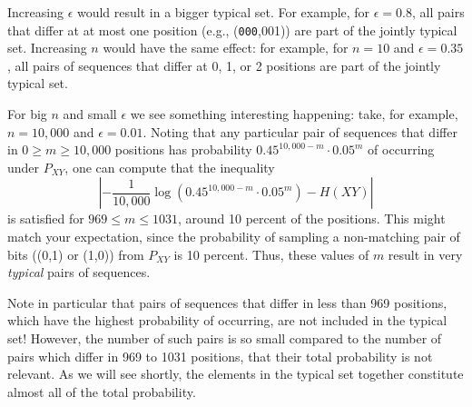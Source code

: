 \begin{example}
Increasing $\epsilon$ would result in a bigger typical set. For example, for $\epsilon = 0.8$, all pairs that differ at at most one position (e.g., (\texttt{000},{001})) are part of the jointly typical set. Increasing $n$ would have the same effect: for example, for $n = 10$ and $\epsilon = 0.35$, all pairs of sequences that differ at 0, 1, or 2 positions are part of the jointly typical set.

For big $n$ and small $\epsilon$ we see something interesting happening: take, for example, $n = 10,000$ and $\epsilon = 0.01$. Noting that any particular pair of sequences that differ in $0 \geq m \geq 10,000$ positions has probability $0.45^{10,000 - m} \cdot 0.05^m$ of occurring under $P_{XY}$, one can compute that the inequality
\[
\left| -\frac{1}{10,000} \log (0.45^{10,000 - m} \cdot 0.05^m) - H(XY)\right|
\]
is satisfied for $969 \leq m \leq 1031$, around 10 percent of the positions. This might match your expectation, since the probability of sampling a non-matching pair of bits ((0,1) or (1,0)) from $P_{XY}$ is 10 percent. Thus, these values of $m$ result in very \emph{typical} pairs of sequences.

Note in particular that pairs of sequences that differ in less than 969 positions, which have the highest probability of occurring, are not included in the typical set! However, the number of such pairs is so small compared to the number of pairs which differ in 969 to 1031 positions, that their total probability is not relevant. As we will see shortly, the elements in the typical set together constitute almost all of the total probability.
\end{example}

